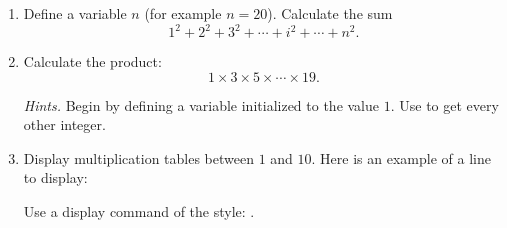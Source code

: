 \documentclass[11pt,class=report,crop=false]{standalone}
\begin{document}

\begin{activite}


\begin{enumerate}
  \item Define a variable $n$ (for example $n=20$). Calculate the sum
  $$1^2+2^2+3^2+\cdots+i^2+\cdots +n^2.$$
  
  \item Calculate the product:
  $$1 \times 3 \times 5 \times \cdots \times 19.$$
  
  \emph{Hints.} Begin by defining a variable  initialized to the value $1$. Use  to get every other integer.
  
  \item Display multiplication tables between $1$ and $10$. Here is an example of a line to display:
  
  Use a display command of the style: .
\end{enumerate}  
\end{activite}
\end{document}
